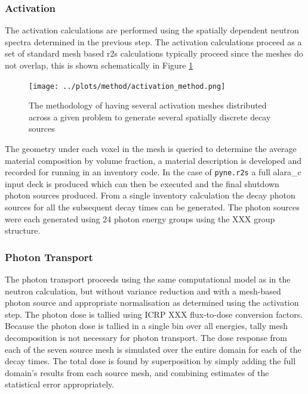 \documentclass[12pt]{article}
\begin{document}

\subsubsection{Activation}
The activation calculations are performed using the spatially dependent neutron
spectra determined in the previous step. The activation calculations proceed as
a set of standard mesh based \gls{r2s} calculations typically proceed since the 
meshes do not overlap, this is shown schematically in Figure
\ref{fig:activation_method}
\begin{figure}[ht!]
  \centering
  \texttt{[image: ../plots/method/activation\_method.png]}
  \caption{The methodology of having several activation meshes distributed
           across a given problem to generate several spatially discrete
           decay sources}
  \label{fig:activation_method}
\end{figure}
The geometry under each voxel in the mesh is queried to 
determine the average material composition by volume fraction, a material 
description is developed and recorded for running in an inventory code. In the 
case of \texttt{pyne.r2s} a full \gls{alara_c} input deck is produced which can
then be executed and the final shutdown photon sources produced. From a single
inventory calculation the decay photon sources for all the subsequent decay
times can be generated.  The photon sources were each generated using 24 photon
energy groups using the XXX group structure.


\subsubsection{Photon Transport}
The photon transport proceeds using the same computational model as in the
neutron calculation, but without variance reduction and with a mesh-based
photon source and appropriate normalisation as determined using the activation
step.  The photon dose is tallied using ICRP XXX flux-to-dose conversion
factors.  Because the photon dose is tallied in a single bin over all
energies, tally mesh decomposition is not necessary for photon transport.  The
dose response from each of the seven source mesh is simulated over the entire
domain for each of the decay times.  The total dose is found by superposition
by simply adding the full domain's results from each source mesh, and
combining estimates of the statistical error appropriately.
\end{document}
